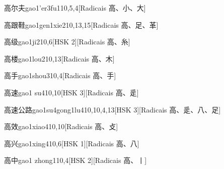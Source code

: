 \begin{entry}{高尔夫}{gao1'er3fu1}{10,5,4}[Radicais ⾼、⼩、⼤]
\end{entry}

\begin{entry}{高跟鞋}{gao1gen1xie2}{10,13,15}[Radicais ⾼、⾜、⾰]
\end{entry}

\begin{entry}{高级}{gao1ji2}{10,6}[HSK 2][Radicais ⾼、⽷]
\end{entry}

\begin{entry}{高楼}{gao1lou2}{10,13}[Radicais ⾼、⽊]
\end{entry}

\begin{entry}{高手}{gao1shou3}{10,4}[Radicais ⾼、⼿]
\end{entry}

\begin{entry}{高速}{gao1 su4}{10,10}[HSK 3][Radicais ⾼、⾡]
\end{entry}

\begin{entry}{高速公路}{gao1su4gong1lu4}{10,10,4,13}[HSK 3][Radicais ⾼、⾡、⼋、⾜]
\end{entry}

\begin{entry}{高效}{gao1xiao4}{10,10}[Radicais ⾼、⽁]
\end{entry}

\begin{entry}{高兴}{gao1xing4}{10,6}[HSK 1][Radicais ⾼、⼋]
\end{entry}

\begin{entry}{高中}{gao1 zhong1}{10,4}[HSK 2][Radicais ⾼、⼁]
\end{entry}

